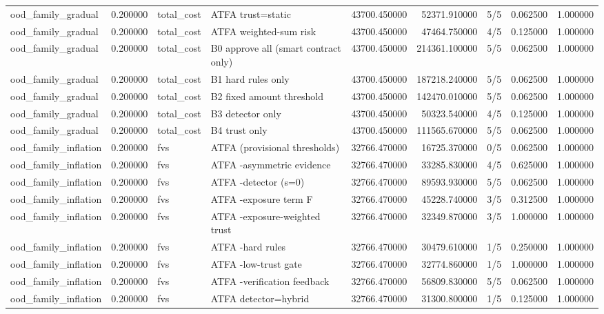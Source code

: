 \begin{tabular}{lrllrrlrr}
ood\_family\_gradual & 0.200000 & total\_cost & ATFA trust=static & 43700.450000 & 52371.910000 & 5/5 & 0.062500 & 1.000000 \\
ood\_family\_gradual & 0.200000 & total\_cost & ATFA weighted-sum risk & 43700.450000 & 47464.750000 & 4/5 & 0.125000 & 1.000000 \\
ood\_family\_gradual & 0.200000 & total\_cost & B0 approve all (smart contract only) & 43700.450000 & 214361.100000 & 5/5 & 0.062500 & 1.000000 \\
ood\_family\_gradual & 0.200000 & total\_cost & B1 hard rules only & 43700.450000 & 187218.240000 & 5/5 & 0.062500 & 1.000000 \\
ood\_family\_gradual & 0.200000 & total\_cost & B2 fixed amount threshold & 43700.450000 & 142470.010000 & 5/5 & 0.062500 & 1.000000 \\
ood\_family\_gradual & 0.200000 & total\_cost & B3 detector only & 43700.450000 & 50323.540000 & 4/5 & 0.125000 & 1.000000 \\
ood\_family\_gradual & 0.200000 & total\_cost & B4 trust only & 43700.450000 & 111565.670000 & 5/5 & 0.062500 & 1.000000 \\
ood\_family\_inflation & 0.200000 & fvs & ATFA (provisional thresholds) & 32766.470000 & 16725.370000 & 0/5 & 0.062500 & 1.000000 \\
ood\_family\_inflation & 0.200000 & fvs & ATFA -asymmetric evidence & 32766.470000 & 33285.830000 & 4/5 & 0.625000 & 1.000000 \\
ood\_family\_inflation & 0.200000 & fvs & ATFA -detector (s=0) & 32766.470000 & 89593.930000 & 5/5 & 0.062500 & 1.000000 \\
ood\_family\_inflation & 0.200000 & fvs & ATFA -exposure term F & 32766.470000 & 45228.740000 & 3/5 & 0.312500 & 1.000000 \\
ood\_family\_inflation & 0.200000 & fvs & ATFA -exposure-weighted trust & 32766.470000 & 32349.870000 & 3/5 & 1.000000 & 1.000000 \\
ood\_family\_inflation & 0.200000 & fvs & ATFA -hard rules & 32766.470000 & 30479.610000 & 1/5 & 0.250000 & 1.000000 \\
ood\_family\_inflation & 0.200000 & fvs & ATFA -low-trust gate & 32766.470000 & 32774.860000 & 1/5 & 1.000000 & 1.000000 \\
ood\_family\_inflation & 0.200000 & fvs & ATFA -verification feedback & 32766.470000 & 56809.830000 & 5/5 & 0.062500 & 1.000000 \\
ood\_family\_inflation & 0.200000 & fvs & ATFA detector=hybrid & 32766.470000 & 31300.800000 & 1/5 & 0.125000 & 1.000000 \\

\end{tabular}
